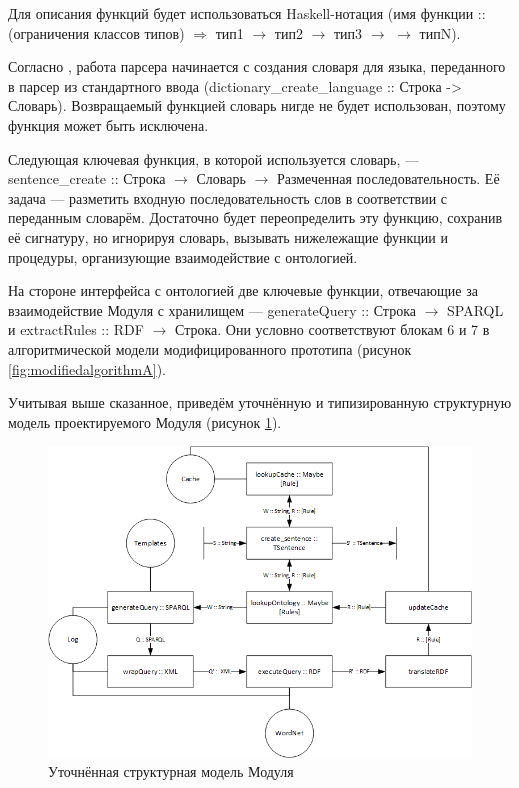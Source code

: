Для описания функций будет использоваться Haskell-нотация (имя функции :: (ограничения классов типов) \(\Rightarrow\) тип1 \(\rightarrow\) тип2 \(\rightarrow\) тип3 \(\rightarrow\) \textellipsis \(\rightarrow\) типN).

Согласно \cite{api}, работа парсера начинается с создания словаря для языка, переданного в парсер из стандартного ввода (dictionary_create_language :: Строка -> Словарь). Возвращаемый функцией словарь нигде не будет использован, поэтому функция может быть исключена.

Следующая ключевая функция, в которой используется словарь, --- sentence_create :: Строка \(\rightarrow\) Словарь \(\rightarrow\) Размеченная последовательность. Её задача --- разметить входную последовательность слов в соответствии с переданным словарём. Достаточно будет переопределить эту функцию, сохранив её сигнатуру, но игнорируя словарь, вызывать нижележащие функции и процедуры, организующие взаимодействие с онтологией.

На стороне интерфейса с онтологией две ключевые функции, отвечающие за взаимодействие Модуля с хранилищем --- generateQuery :: Строка \(\rightarrow\) SPARQL и extractRules :: RDF \(\rightarrow\) Строка. Они условно соответствуют блокам 6 и 7 в алгоритмической модели модифицированного прототипа (рисунок \ref{fig:modifiedalgorithmA}).

Учитывая выше сказанное, приведём уточнённую и типизированную структурную модель проектируемого Модуля (рисунок \ref{fig:typedstructure}).

\begin{figure}[H]
	\centering
		\includegraphics[scale=0.8]{images/typedstructure.png}
	\caption{\small Уточнённая структурная модель Модуля}
	\label{fig:typedstructure}
\end{figure} 

